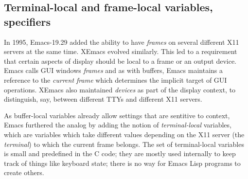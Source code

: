 \documentclass[format=acmsmall, review]{acmart}
\newcommand \Elisp {Emacs Lisp}
\begin{document}








\subsection{Terminal-local and frame-local variables, specifiers}

In 1995, Emacs-19.29 added the ability to have \emph{frames} on
several different X11 servers at the same time.  XEmacs evolved
similarly.  This led to a requirement that certain aspects of display
should be local to a frame or an output device.  Emacs calls GUI
windows \emph{frames} and as with buffers, Emacs maintains a reference
to the \emph{current frame} which determines the implicit target of
GUI operations.  XEmacs also maintained \emph{devices} as part of
the display context, to distinguish, say, between different TTYs and
different X11 servers.

As buffer-local variables already allow settings that are sentitive to
context, Emacs furthered the analog by adding the notion of
\emph{terminal-local} variables, which are variables which take
different values depending on the X11 server (the \emph{terminal}) to
which the current frame belongs.  The set of terminal-local variables
is small and predefined in the C code; they are mostly used internally
to keep track of things like keyboard state; there is no way for
\Elisp{} programs to create others.
\end{document}
